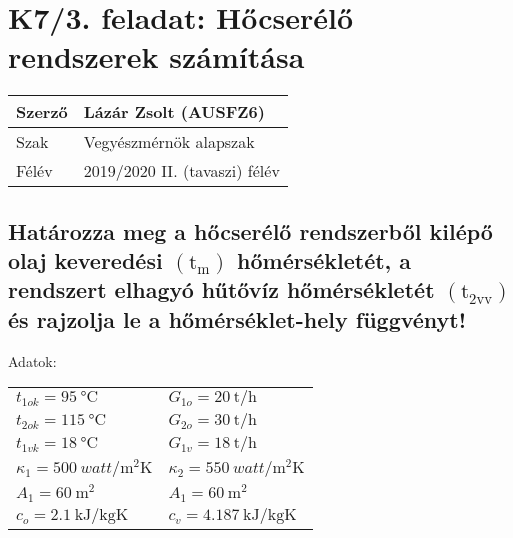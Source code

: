 \section*{K7/3. feladat: Hőcserélő rendszerek számítása}


\begin{tabular}{ | p{2cm} | p{12cm} | } 
	\hline
	Szerző & Lázár Zsolt (AUSFZ6) \\ 
	\hline
	Szak & Vegyészmérnök alapszak \\ 
	\hline
	Félév & 2019/2020 II. (tavaszi) félév \\ 
	\hline
\end{tabular}

\vspace{0.5cm}

\subsection*{Határozza meg a hőcserélő rendszerből kilépő olaj keveredési $ \mathrm{(t_m)}$ hőmérsékletét, a rendszert elhagyó hűtővíz hőmérsékletét $\mathrm{(t_{2vv})}$ és rajzolja le a hőmérséklet-hely függvényt!}

\vspace{1cm}

\flushleft Adatok: \newline \\
\centering
\begin{tabular} [c!] {l l}

$t_{1ok}= \SI{95}{\celsius}$ & $G_{1o}= \SI{20}{\tonne\per\hour}$ \\
$t_{2ok}= \SI{115}{\celsius}$ & $G_{2o}= \SI{30}{\tonne\per\hour}$ \\
$t_{1vk}= \SI{18}{\celsius}$ & $G_{1v}= \SI{18}{\tonne\per\hour}$	\\
$\kappa_1= \SI{500}{watt\per\meter\squared\kelvin}$ & $\kappa_2= \SI{550}{watt\per\meter\squared\kelvin}$ \\
$A_1= \SI{60}{\meter\squared}$ & $A_1= \SI{60}{\meter\squared}$	\\
$c_o= \SI{2,1}{\kilo\joule\per\kilogram\kelvin}$ & $c_v= \SI{4,187}{\kilo\joule\per\kilogram\kelvin}$	\\

\end{tabular}

\vspace{1.5cm}

